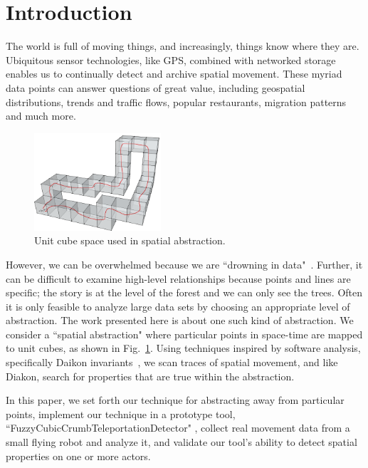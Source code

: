 \section{Introduction}

The world is full of moving things, and increasingly, things know where they are. 
Ubiquitous sensor technologies, like GPS, combined with networked storage enables us to continually detect and archive spatial movement.
These myriad data points can answer questions of great value, including geospatial distributions, trends and traffic flows, popular restaurants, migration patterns and much more.

\begin{figure}
  \centering
  \includegraphics[width=0.42\textwidth]{./figures/path_overview}
  \caption{Unit cube space used in spatial abstraction.}
  \label{fig:unitCubes}
\end{figure}

However, we can be overwhelmed because we are ``drowning in data"~\cite{morse1993drowning}.
Further, it can be difficult to examine high-level relationships because points and lines are specific; the story is at the level of the forest and we can only see the trees.  
Often it is only feasible to analyze large data sets by choosing an appropriate level of abstraction.
The work presented here is about one such kind of abstraction.
We consider a ``spatial abstraction" where particular points in space-time are mapped to unit cubes, as shown in Fig.~\ref{fig:unitCubes}.
Using techniques inspired by software analysis, specifically Daikon invariants~\cite{kataoka2001automated}, we scan traces of spatial movement, and like Diakon, search for properties that are true within the abstraction.  

In this paper, we set forth our technique for abstracting away from particular points, 
implement our technique in a prototype tool, ``FuzzyCubicCrumbTeleportationDetector" , 
collect real movement data from a small flying robot and analyze it, 
and validate our tool's ability to detect spatial properties on one or more actors.


